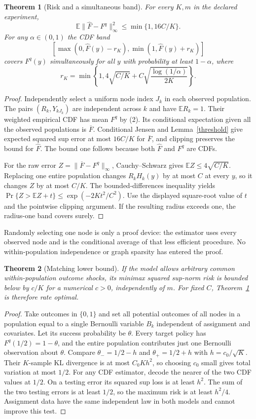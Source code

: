 \documentclass[11pt]{article}
\newtheorem{theorem}{Theorem}
\theoremstyle{remark}\newtheorem{remark}[theorem]{Remark}
\newcommand{\E}{\mathbb E}
\begin{document}
\begin{theorem}[Risk and a simultaneous band]\label{mainupper}
For every $K,m$ in the declared experiment,
\[
 \E\|\widehat F-F^q\|_\infty^2\leq\min\{1,16C/K\}.
\]
For any $\alpha\in(0,1)$ the CDF band
\[
 [\max(0,\widehat F(y)-r_K),\min(1,\widehat F(y)+r_K)]
\]
covers $F^q(y)$ simultaneously for all $y$ with probability at least $1-\alpha$, where
\[
 r_K=\min\left\{1,4\sqrt{C/K}
                     +C\sqrt{\frac{\log(1/\alpha)}{2K}}\right\}.
\]
\end{theorem}
\begin{proof}
Independently select a uniform node index $J_k$ in each observed population. The pairs $(R_k,Y_{kJ_k})$ are independent across $k$ and have $\E R_k=1$. Their weighted empirical CDF has mean $F^q$ by (2). Its conditional expectation given all the observed populations is $\overline F$. Conditional Jensen and Lemma~\ref{threshold} give expected squared sup error at most $16C/K$ for $\overline F$, and clipping preserves the bound for $\widehat F$. The bound one follows because both $\widehat F$ and $F^q$ are CDFs.

For the raw error $Z=\|\overline F-F^q\|_\infty$, Cauchy--Schwarz gives $\E Z\leq4\sqrt{C/K}$. Replacing one entire population changes $R_kH_k(y)$ by at most $C$ at every $y$, so it changes $Z$ by at most $C/K$. The bounded-differences inequality yields
$\Pr\{Z>\E Z+t\}\leq\exp(-2Kt^2/C^2)$.
Use the displayed square-root value of $t$ and the pointwise clipping argument. If the resulting radius exceeds one, the radius-one band covers surely.
\end{proof}

Randomly selecting one node is only a proof device: the estimator uses every observed node and is the conditional average of that less efficient procedure. No within-population independence or graph sparsity has entered the proof.

\begin{theorem}[Matching lower bound]\label{lower}
If the model allows arbitrary common within-population outcome shocks, its minimax squared sup-norm risk is bounded below by $c/K$ for a numerical $c>0$, independently of $m$. For fixed $C$, Theorem~\ref{mainupper} is therefore rate optimal.
\end{theorem}
\begin{proof}
Take outcomes in $\{0,1\}$ and set all potential outcomes of all nodes in a population equal to a single Bernoulli variable $B_k$ independent of assignment and covariates. Let its success probability be $\theta$. Every target policy has $F^q(1/2)=1-\theta$, and the entire population contributes just one Bernoulli observation about $\theta$. Compare $\theta_-=1/2-h$ and $\theta_+=1/2+h$ with $h=c_0/\sqrt K$. Their $K$-sample KL divergence is at most $C_0Kh^2$, so choosing $c_0$ small gives total variation at most $1/2$. For any CDF estimator, decode the nearer of the two CDF values at $1/2$. On a testing error its squared sup loss is at least $h^2$. The sum of the two testing errors is at least $1/2$, so the maximum risk is at least $h^2/4$. Assignment data have the same independent law in both models and cannot improve this test.
\end{proof}
\end{document}
